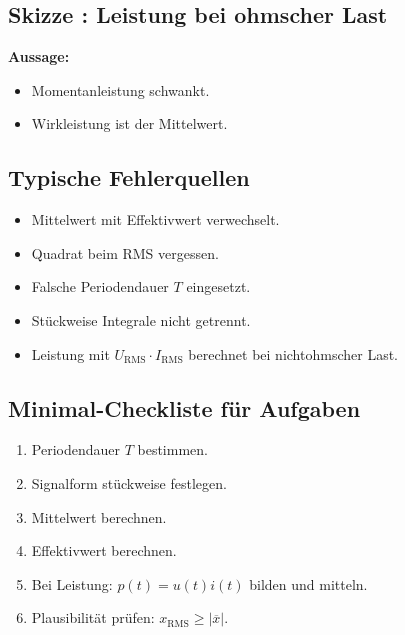 \subsection{Skizze : Leistung bei ohmscher Last}

\begin{center}
\end{center}

\textbf{Aussage:}
\begin{itemize}
    \item Momentanleistung schwankt.
    \item Wirkleistung ist der Mittelwert.
\end{itemize}

\subsection{Typische Fehlerquellen}

\begin{itemize}
    \item Mittelwert mit Effektivwert verwechselt.
    \item Quadrat beim RMS vergessen.
    \item Falsche Periodendauer $T$ eingesetzt.
    \item Stückweise Integrale nicht getrennt.
    \item Leistung mit $U_{\mathrm{RMS}}\cdot I_{\mathrm{RMS}}$ berechnet bei nichtohmscher Last.
\end{itemize}

\subsection{Minimal-Checkliste für Aufgaben}

\begin{enumerate}
    \item Periodendauer $T$ bestimmen.
    \item Signalform stückweise festlegen.
    \item Mittelwert berechnen.
    \item Effektivwert berechnen.
    \item Bei Leistung: $p(t)=u(t)i(t)$ bilden und mitteln.
    \item Plausibilität prüfen: $x_{\mathrm{RMS}} \ge |\overline{x}|$.
\end{enumerate}

